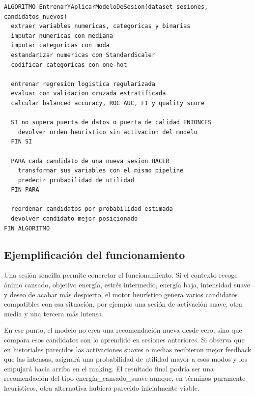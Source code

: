 \begin{listing}[H]
\begin{verbatim}
ALGORITMO EntrenarYAplicarModeloDeSesion(dataset_sesiones, candidatos_nuevos)
  extraer variables numericas, categoricas y binarias
  imputar numericas con mediana
  imputar categoricas con moda
  estandarizar numericas con StandardScaler
  codificar categoricas con one-hot

  entrenar regresion logistica regularizada
  evaluar con validacion cruzada estratificada
  calcular balanced accuracy, ROC AUC, F1 y quality score

  SI no supera puerta de datos o puerta de calidad ENTONCES
    devolver orden heuristico sin activacion del modelo
  FIN SI

  PARA cada candidato de una nueva sesion HACER
    transformar sus variables con el mismo pipeline
    predecir probabilidad de utilidad
  FIN PARA

  reordenar candidatos por probabilidad estimada
  devolver candidato mejor posicionado
FIN ALGORITMO
\end{verbatim}
\caption{Pseudocódigo del entrenamiento y uso del modelo de regresión logística de sesión.}
\label{lst:pseudocodigo_regresion_logistica}
\end{listing}

\subsection{Ejemplificación del funcionamiento}

Una sesión sencilla permite concretar el funcionamiento. Si el contexto recoge
ánimo cansado, objetivo energía, estrés intermedio, energía baja, intensidad
suave y deseo de acabar más despierto, el motor heurístico
genera varios candidatos compatibles con esa situación, por ejemplo una sesión
de activación suave, otra media y una tercera más intensa.

En ese punto, el modelo no crea una recomendación nueva desde cero, sino que
compara esos candidatos con lo aprendido en sesiones anteriores. Si observa que
en historiales parecidos las activaciones suaves o medias recibieron mejor
feedback que las intensas, asignará una probabilidad de utilidad mayor a esos
modos y los empujará hacia arriba en el ranking. El resultado final podría ser
una recomendación del tipo energía\_cansado\_suave aunque, en términos
puramente heurísticos, otra alternativa hubiera parecido inicialmente viable.

